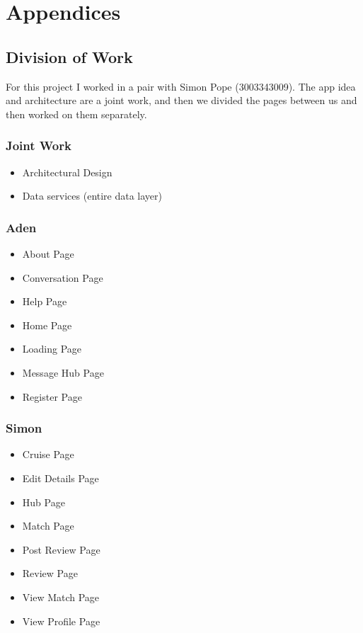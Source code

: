 \documentclass[a4paper, 11pt]{article}
\begin{document}
\section{Appendices}
\subsection{Division of Work}
For this project I worked in a pair with Simon Pope (3003343009). The app idea and architecture are a joint work, and then we divided the pages between us and then worked on them separately.

\subsubsection{Joint Work}
\begin{itemize}
	\item{Architectural Design}
	\item{Data services (entire data layer)}
\end{itemize}

\subsubsection{Aden}

\begin{itemize}
	\item{About Page}
	\item{Conversation Page}
	\item{Help Page}
	\item{Home Page}
	\item{Loading Page}
	\item{Message Hub Page}
	\item{Register Page}
\end{itemize}

\subsubsection{Simon}

\begin{itemize}
	\item{Cruise Page}
	\item{Edit Details Page}
	\item{Hub Page}
	\item{Match Page}
	\item{Post Review Page}
	\item{Review Page}
	\item{View Match Page}
	\item{View Profile Page}
\end{itemize}




\end{document}
